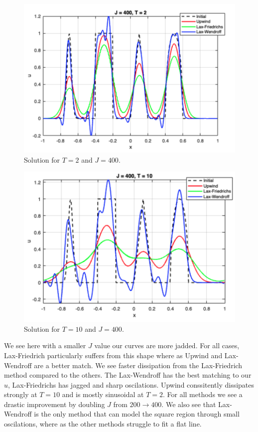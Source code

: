 \begin{solution}
\begin{figure}[H]
    \centering
    \includegraphics[scale=0.4]{./figures/q3-t2j400.png}
    \caption{Solution for $T = 2$ and $J = 400$.}
\end{figure}
\begin{figure}[H]
    \centering
    \includegraphics[scale=0.4]{./figures/q3-t10j400.png}
    \caption{Solution for $T = 10$ and $J = 400$.}
\end{figure}
We see here with a smaller $J$ value our curves are more jadded. For all cases, Lax-Friedrich particularly suffers from this shape where as Upwind and Lax-Wendroff are a better match. We see faster dissipation from the Lax-Friedrich method compared to the others. The Lax-Wendroff has the best matching to our $u$, Lax-Friedrichs has jagged and sharp oscilations. Upwind conssitently dissipates strongly at $T = 10$ and is mostly sinusoidal at $T = 2$. For all methods we see a drastic improvement by doubling $J$ from $200 \to 400$. We also see that Lax-Wendroff is the only method that can model the square region through small oscilations, where as the other methods struggle to fit a flat line.


\end{solution}
